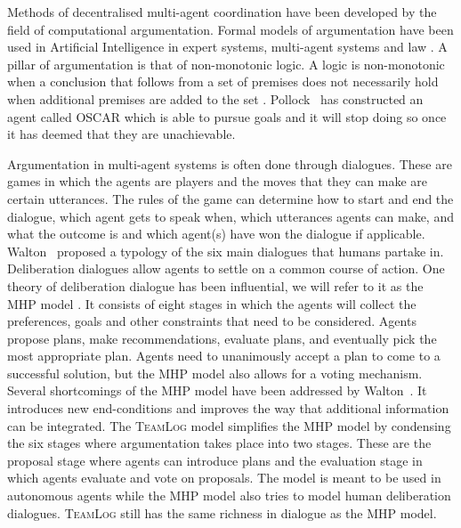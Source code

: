 Methods of decentralised multi-agent coordination have been developed by the 
field of
computational argumentation. Formal models of argumentation have been used in
Artificial Intelligence in expert systems, multi-agent systems and law
\cite{vaneemeren2014}. A pillar of argumentation is that of non-monotonic 
logic. A logic is non-monotonic when a conclusion that follows from a set of 
premises does not necessarily hold when additional premises are 
added to the set \cite{modgil2013,vaneemeren2014}. 
Pollock~ has 
constructed an agent called OSCAR which is able to pursue goals and it will 
stop doing so once it has deemed that they are unachievable. 

Argumentation in multi-agent systems is often done through dialogues. These are 
games in which the agents are players and the moves that they can make are 
certain utterances. The rules of the game can determine how to start 
and end the dialogue, which agent gets to speak when, which utterances agents 
can make, and what the outcome is and which agent(s) have won the dialogue if 
applicable. Walton~ proposed a typology of the six main 
dialogues 
that humans partake in. Deliberation dialogues allow agents to settle on a 
common course of action. One theory of deliberation dialogue has been 
influential, we will refer to it as the MHP model \cite{mcburney2007}. It 
consists of eight stages in which the agents will collect the preferences, 
goals and other constraints that need to be considered. Agents propose plans, 
make recommendations, evaluate plans, and eventually pick the most appropriate 
plan. Agents need to unanimously accept a plan to come to a successful 
solution, but the MHP model also allows for a voting mechanism. Several 
shortcomings of the MHP model have been addressed by 
Walton~. It 
introduces new end-conditions and improves the way that additional information 
can be integrated. The \textsc{TeamLog} model \cite{dunin-keplicz2011} 
simplifies the MHP model by condensing the six stages where argumentation takes 
place into two stages. These are the proposal stage where agents can introduce 
plans and the evaluation stage in which agents evaluate and vote on proposals. 
The model is meant to be used in autonomous agents while the MHP model also 
tries to model human deliberation dialogues.
\textsc{TeamLog} still has the same richness in dialogue as the MHP model.

